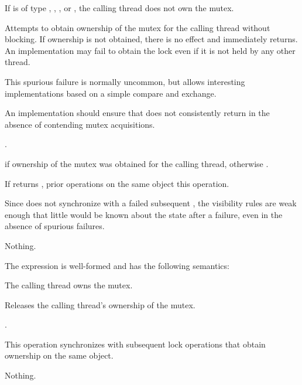 \begin{itemdescr}
\pnum
\expects
If  is of type , ,
, or , the calling
thread does not own the mutex.

\pnum
\effects
Attempts to obtain ownership of the mutex for the calling thread without
blocking. If ownership is not obtained, there is no effect and 
immediately returns. An implementation may fail to obtain the lock even if it is not
held by any other thread.
\begin{note}
This spurious failure is normally uncommon, but
allows interesting implementations based on a simple
compare and exchange.
\end{note}
An implementation should ensure that  does not consistently return 
in the absence of contending mutex acquisitions.

\pnum
\returntype {}.

\pnum
\returns
{} if ownership of the mutex was obtained for the calling
thread, otherwise .

\pnum
\sync
If  returns , prior  operations
on the same object  this operation.
\begin{note}
Since  does not synchronize with a failed subsequent
, the visibility rules are weak enough that little would be
known about the state after a failure, even in the absence of spurious failures.
\end{note}

\pnum
\throws
Nothing.
\end{itemdescr}

\pnum
The expression  is well-formed and has the following semantics:

\begin{itemdescr}
\pnum
\expects
The calling thread owns the mutex.

\pnum
\effects
Releases the calling thread's ownership of the mutex.

\pnum
\returntype {}.

\pnum
\sync
This operation synchronizes with subsequent
lock operations that obtain ownership on the same object.

\pnum
\throws
Nothing.
\end{itemdescr}

